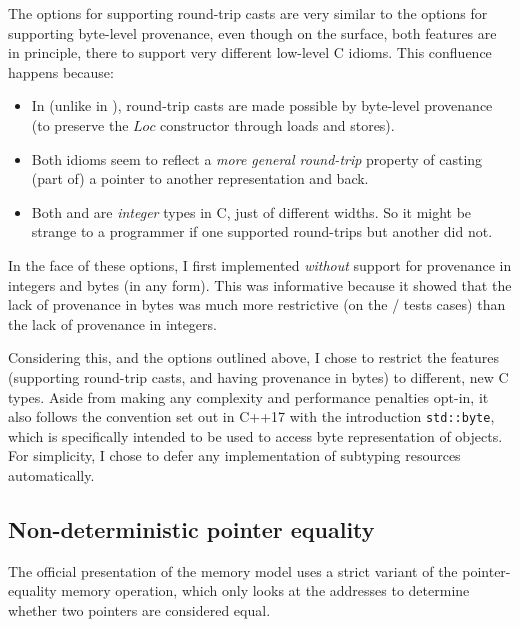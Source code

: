 The options for supporting round-trip casts are very similar to the options for
supporting byte-level provenance, even though on the surface, both features are
in principle, there to support very different low-level C idioms. This confluence
happens because:
\begin{itemize}
    \item In  (unlike in ), round-trip casts are made
        possible by byte-level provenance (to preserve the $\mathit{Loc}$
        constructor through loads and stores).
    \item Both idioms seem to reflect a \emph{more general round-trip} property
        of casting (part of) a pointer to another representation and back.
    \item Both  and  are \emph{integer} types in
        C, just of different widths. So it might be strange to a programmer if
        one supported round-trips but another did not.
\end{itemize}

In the face of these options, I first implemented  \emph{without}
support for provenance in integers and bytes (in any form). This was
informative because it showed that the lack of provenance in bytes was much
more restrictive (on the / tests cases) than the lack
of provenance in integers.

Considering this, and the options outlined above, I chose to restrict
the features (supporting round-trip casts, and having provenance in
bytes) to different, new C types. Aside from making any complexity and
performance penalties opt-in, it also follows the convention set out in C++17
with the introduction \texttt{std::byte}, which is specifically
intended to be used to access byte representation of objects. For simplicity, I
chose to defer any implementation of subtyping resources automatically.

\subsection{Non-deterministic pointer equality}\label{subsec:non-det-ptr-eq}

The official presentation of the  memory model uses a strict variant of
the pointer-equality memory operation, which only looks at the addresses to
determine whether two pointers are considered equal.

